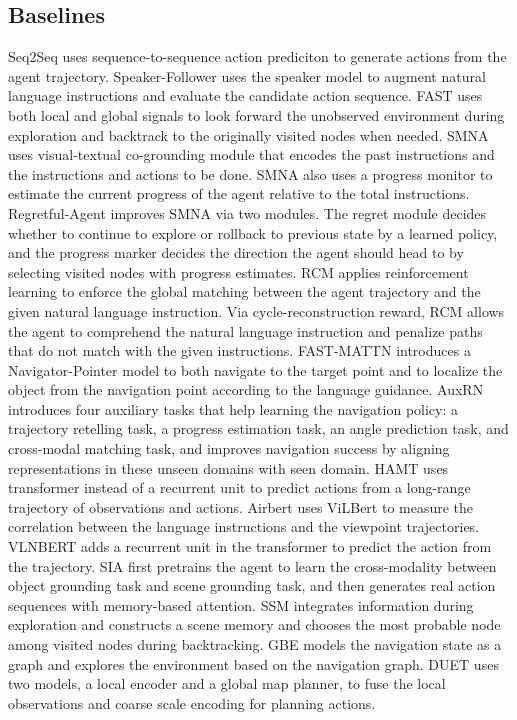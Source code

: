\documentclass[10pt,twocolumn,letterpaper]{article}
\begin{document}
\subsection{Baselines}
\noindent Seq2Seq \cite{anderson2018vision} uses sequence-to-sequence action prediciton to generate actions from the agent trajectory.
Speaker-Follower \cite{fried2018speaker} uses the speaker model to augment natural language instructions and evaluate the candidate action sequence. 
FAST \cite{ke2019tactical} uses both local and global signals to look forward the unobserved environment during exploration and backtrack to the originally visited nodes when needed.
SMNA \cite{ma2019self} uses visual-textual co-grounding module that encodes the past instructions and the instructions and actions to be done. SMNA also uses a progress monitor to estimate the current progress of the agent relative to the total instructions.
Regretful-Agent \cite{ma2019regretful} improves SMNA via two modules. The regret module decides whether to continue to explore or rollback to previous state by a learned policy, and the progress marker decides the direction the agent should head to by selecting visited nodes with progress estimates.
RCM \cite{wang2019reinforced} applies reinforcement learning to enforce the global matching between the agent trajectory and the given natural language instruction. Via cycle-reconstruction reward, RCM allows the agent to comprehend the natural language instruction and penalize paths that do not match with the given instructions.
FAST-MATTN \cite{qi2020reverie} introduces a Navigator-Pointer model to both navigate to the target point and to localize the object from the navigation point according to the language guidance.
AuxRN \cite{zhu2020vision} introduces four auxiliary tasks that help learning the navigation policy: a trajectory retelling task, a progress estimation task, an angle prediction task, and cross-modal matching task, and improves navigation success by aligning representations in these unseen domains with seen domain.
HAMT \cite{chen2021history} uses transformer instead of a recurrent unit to predict actions from a long-range trajectory of observations and actions.
Airbert \cite{guhur2021airbert} uses ViLBert \cite{lu2019vilbert} to measure the correlation between the language instructions and
the viewpoint trajectories.
VLNBERT \cite{hong2021vln} adds a recurrent unit in the transformer to predict the action from the trajectory.
SIA \cite{Lin_2021_CVPRsia} first pretrains the agent to learn the cross-modality between object grounding task and scene grounding task, and then generates real action sequences with memory-based attention.
SSM \cite{Wang_2021_CVPR-structured-scene} integrates information during exploration and constructs a scene memory and chooses the most probable node among visited nodes during backtracking. 
GBE \cite{zhu2021soon} models the navigation state as a graph and explores the environment based on the navigation graph.
DUET \cite{chen2022think} uses two models, a local encoder and a global map planner, to fuse the local observations and coarse scale encoding
for planning actions.\\
\end{document}
